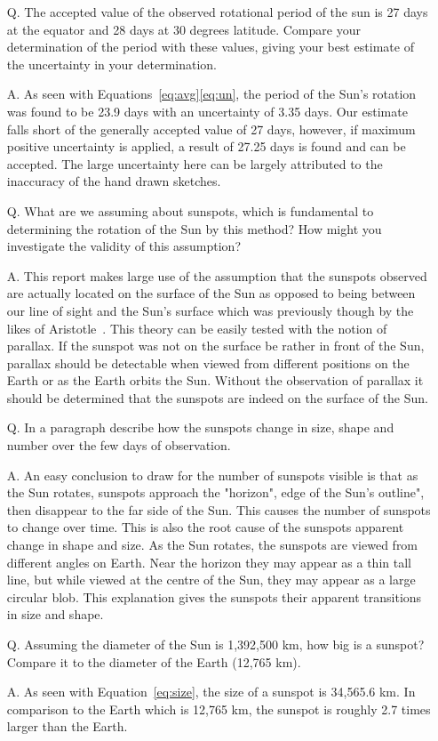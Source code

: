 \documentclass{article}
\begin{document}
\begin{enumerate}
\item[Q.] The accepted value of the observed rotational period of the sun is 27 days at the equator and 28 days
at 30 degrees latitude. Compare your determination of the period with these values, giving your best estimate
of the uncertainty in your determination.
\item[A.] As seen with Equations~\ref{eq:avg}\ref{eq:un}, the period of the Sun's rotation was found to be
23.9 days with an uncertainty of 3.35 days. Our estimate falls short of the generally accepted value of 27 days,
however, if maximum positive uncertainty is applied, a result of 27.25 days is found and can be accepted. The
large uncertainty here can be largely attributed to the inaccuracy of the hand drawn sketches.
\item[Q.] What are we assuming about sunspots, which is fundamental to determining the rotation of the Sun
by this method? How might you investigate the validity of this assumption?
\item[A.] This report makes large use of the assumption that the sunspots observed are actually located on
the surface of the Sun as opposed to being between our line of sight and the Sun's surface which was previously
though by the likes of Aristotle~\cite{Aristotle:2012}. This theory can be easily tested with the notion of parallax.
If the sunspot was not on the surface be rather in front of the Sun, parallax should be detectable when viewed from
different positions on the Earth or as the Earth orbits the Sun. Without the observation of parallax it should be
determined that the sunspots are indeed on the surface of the Sun.
\item[Q.] In a paragraph describe how the sunspots change in size, shape and number over the few days of observation.
\item[A.] An easy conclusion to draw for the number of sunspots visible is that as the Sun rotates, sunspots approach
the "horizon", edge of the Sun's outline", then disappear to the far side of the Sun. This causes the number of sunspots
to change over time. This is also the root cause of the sunspots apparent change in shape and size. As the Sun rotates,
the sunspots are viewed from different angles on Earth. Near the horizon they may appear as a thin tall line, but 
while viewed at the centre of the Sun, they may appear as a large circular blob. This explanation gives the sunspots
their apparent transitions in size and shape.
\item[Q.] Assuming the diameter of the Sun is 1,392,500 km, how big is a sunspot? Compare it to the diameter
of the Earth (12,765 km).
\item[A.] As seen with Equation~\ref{eq:size}, the size of a sunspot is 34,565.6 km. In comparison to the Earth
which is 12,765 km, the sunspot is roughly 2.7 times larger than the Earth.
\end{enumerate}
\end{document}
